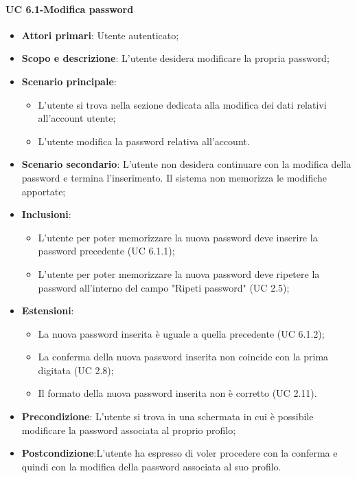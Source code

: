          \paragraph{UC 6.1-Modifica password}
            \begin{itemize}
                \item \textbf{Attori primari}: Utente autenticato;
               
                \item \textbf{Scopo e descrizione}: L'utente desidera modificare la propria password; 
                \item \textbf{Scenario principale}:
                    \begin{itemize}
                        \item L'utente si trova nella sezione dedicata alla modifica dei dati relativi all'account utente;
                        \item L'utente modifica la password relativa all'account.
                    \end{itemize}
                \item \textbf{Scenario secondario}: L'utente non desidera continuare con la modifica della password e termina l'inserimento. Il sistema non memorizza le modifiche apportate;
                 \item \textbf{Inclusioni}: 
                    \begin{itemize}
                        \item L'utente per poter memorizzare la nuova password deve inserire la password precedente (UC 6.1.1);
                        \item  L'utente per poter memorizzare la nuova password deve ripetere la password all'interno del campo "Ripeti password" (UC 2.5);
                    \end{itemize}
                \item \textbf{Estensioni}:
                    \begin{itemize}
                        \item La nuova password inserita è uguale a quella precedente (UC 6.1.2);
                        \item La conferma della nuova password inserita non coincide con la prima digitata (UC 2.8);
                        \item Il formato della nuova password inserita non è corretto (UC 2.11).
                    \end{itemize}
               
                \item \textbf{Precondizione}: L'utente si trova in una schermata in cui è possibile modificare la password associata al proprio profilo;
                \item \textbf{Postcondizione}:L’utente ha espresso di voler procedere con la conferma e quindi
                con la modifica della password associata al suo profilo.
            \end{itemize}
        
